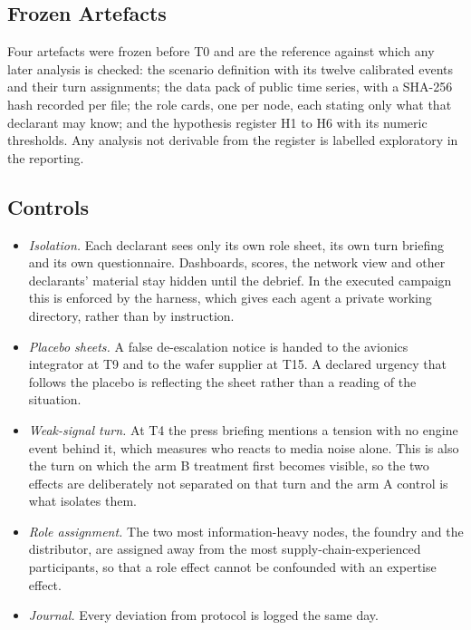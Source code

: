 \subsection*{Frozen Artefacts}

Four artefacts were frozen before T0 and are the reference against which any later analysis
is checked: the scenario definition with its twelve calibrated events and their turn
assignments; the data pack of public time series, with a SHA-256 hash recorded per file; the
role cards, one per node, each stating only what that declarant may know; and the hypothesis
register H1 to H6 with its numeric thresholds. Any analysis not derivable from the register
is labelled exploratory in the reporting.

\subsection*{Controls}

\begin{itemize}
    \item \emph{Isolation.} Each declarant sees only its own role sheet, its own turn
    briefing and its own questionnaire. Dashboards, scores, the network view and other
    declarants' material stay hidden until the debrief. In the executed campaign this is
    enforced by the harness, which gives each agent a private working directory, rather than
    by instruction.
    \item \emph{Placebo sheets.} A false de-escalation notice is handed to the avionics
    integrator at T9 and to the wafer supplier at T15. A declared urgency that follows the
    placebo is reflecting the sheet rather than a reading of the situation.
    \item \emph{Weak-signal turn.} At T4 the press briefing mentions a tension with no
    engine event behind it, which measures who reacts to media noise alone. This is also the
    turn on which the arm B treatment first becomes visible, so the two effects are
    deliberately not separated on that turn and the arm A control is what isolates them.
    \item \emph{Role assignment.} The two most information-heavy nodes, the foundry and
    the distributor, are assigned away from the most supply-chain-experienced participants,
    so that a role effect cannot be confounded with an expertise effect.
    \item \emph{Journal.} Every deviation from protocol is logged the same day.
\end{itemize}

